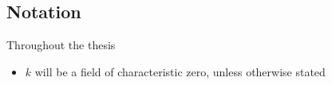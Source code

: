 


\subsection*{Notation}

Throughout the thesis 
\begin{itemize}
    \item $k$ will be a field of characteristic zero, unless otherwise stated

    
    
\end{itemize}
